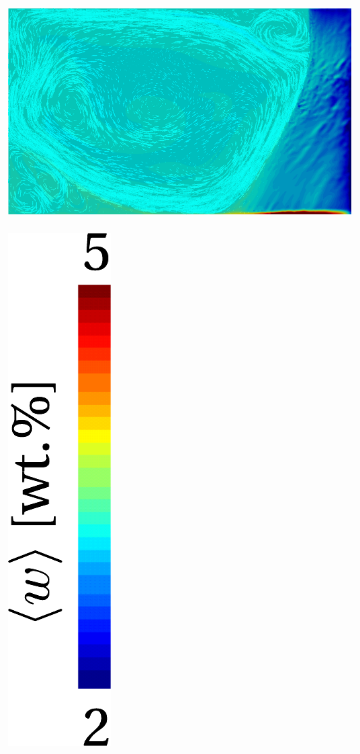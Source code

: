 \begin{figure}[htbp]
\centering
  \begin{subfigure}[t]{0.4\textwidth}
    \centering
  \includegraphics[width=\textwidth]{Chapter5/Graphics/2d/ref_2800s_nosliptop.png}
  \caption{}
    \label{fig:noslip2800}
  \end{subfigure}
  \begin{subfigure}[t]{0.15\textwidth}
    \centering
  \includegraphics[width=0.3\textwidth]{Chapter5/Graphics/2d/colorbar.pdf}

\end{subfigure}
\end{figure}
